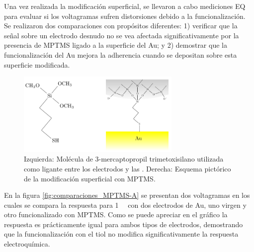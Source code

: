 			 Una vez realizada la modificación superficial, se llevaron a cabo mediciones EQ para evaluar si los voltagramas sufren distorsiones debido a la funcionalización. Se realizaron dos comparaciones con propósitos diferentes: 1) verificar que la señal sobre un electrodo desnudo no se vea afectada significativamente por la presencia de MPTMS ligado a la superficie del Au; y 2) demostrar que la funcionalización del Au mejora la adherencia cuando se depositan \pdm\space sobre esta superficie modificada.

			 \begin{figure}[!ht]
							\begin{center}
							\includegraphics[width=0.70\textwidth]{Esquemas/mod_sup.pdf}
							\caption[Modificación superficial de los electrodos.]{Izquierda: Molécula de  3-mercaptopropil trimetoxisilano utilizada como ligante entre los electrodos y las \pdm. Derecha: Esquema pictórico de la modificación superficial con MPTMS.}
							\label{fig:mod_sup}
							\end{center}
							\end{figure}
										
			 En la figura \ref{fig:comparaciones_MPTMS-A} se presentan dos voltagramas en los cuales se compara la respuesta para \aminorutenio\space \SI{1}{\milli\Molar} con dos electrodos de Au, uno virgen y otro funcionalizado con MPTMS. Como se puede apreciar en el gráfico la respuesta es prácticamente igual para ambos tipos de electrodos, demostrando que la funcionalización con el tiol no modifica significativamente la respuesta electroquímica.

